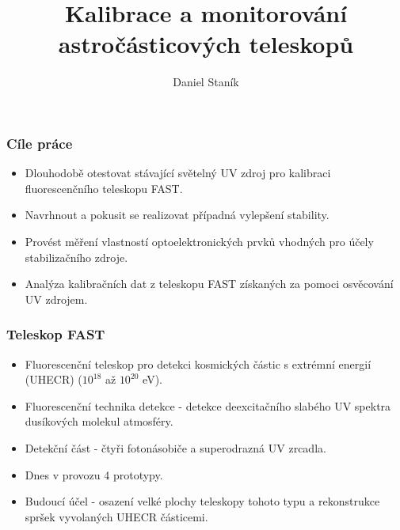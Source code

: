 \documentclass{beamer}
\title{Kalibrace a monitorování astročásticových teleskopů}
\author{Daniel Staník}
\institute{
SLO}
\date{\displaydate{date}}
\begin{document}
\begin{frame}

{
\titlepage
}
\end{frame}



\begin{frame}
\frametitle{Cíle práce}
\begin{itemize}
 \item Dlouhodobě otestovat stávající světelný UV zdroj pro kalibraci fluorescenčního teleskopu FAST. 
 \item Navrhnout a pokusit se realizovat případná vylepšení stability. 
 \item Provést měření vlastností optoelektronických prvků vhodných pro účely stabilizačního zdroje.
 \item Analýza kalibračních dat z teleskopu FAST získaných za pomoci osvěcování UV zdrojem.
\end{itemize}

\end{frame}










\begin{frame}
\frametitle{Teleskop FAST}
\begin{itemize}
 \item Fluorescenční teleskop pro detekci kosmických částic s extrémní energií (UHECR) ($10^{18}$ až $10^{20}$ eV).
 \item Fluorescenční technika detekce - detekce deexcitačního slabého UV spektra dusíkových molekul atmosféry.
 \item Detekční část - čtyři fotonásobiče a superodrazná UV zrcadla.
 \item Dnes v provozu 4 prototypy.
 \item Budoucí účel - osazení velké plochy teleskopy tohoto typu a rekonstrukce spršek vyvolaných UHECR částicemi.
\end{itemize}

\end{frame}
\end{document}
